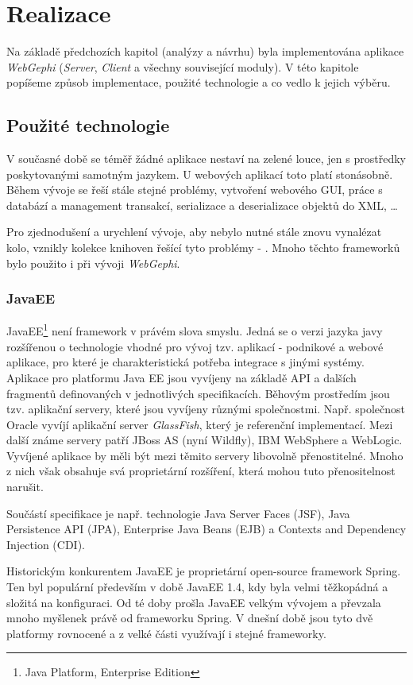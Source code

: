 \documentclass[thesis=M,czech]{FITthesis}[2014/05/6]
\begin{document}
\chapter{Realizace}
Na základě předchozích kapitol (analýzy a návrhu) byla implementována aplikace \textit{WebGephi} (\textit{Server}, \textit{Client} a všechny související moduly).
V této kapitole popíšeme způsob implementace, použité technologie a co vedlo k jejich výběru.

\section{Použité technologie}
V současné době se téměř žádné aplikace nestaví na zelené louce, jen s prostředky poskytovanými samotným jazykem. U webových aplikací 
toto platí stonásobně. Během vývoje se řeší stále stejné problémy, vytvoření webového GUI, práce s databází a management transakcí, serializace a deserializace 
objektů do XML, \ldots

Pro zjednodušení a urychlení vývoje, aby nebylo nutné stále znovu vynalézat kolo, vznikly kolekce knihoven řešící tyto problémy - . Mnoho 
těchto frameworků bylo použito i při vývoji \textit{WebGephi}. 

\subsection{JavaEE\cite{javaEE}}
JavaEE\footnote{Java Platform, Enterprise Edition} není framework v právém slova smyslu. Jedná se o verzi jazyka javy 
rozšířenou o technologie vhodné pro vývoj tzv.  aplikací - podnikové a webové aplikace, pro které je charakteristická potřeba 
integrace s jinými systémy. Aplikace pro platformu Java EE jsou vyvíjeny na základě API a dalších fragmentů definovaných v jednotlivých specifikacích.
Běhovým prostředím jsou tzv. aplikační servery, které jsou vyvíjeny různými společnostmi. Např. společnost Oracle vyvíjí aplikační server \textit{GlassFish}, který je
referenční implementací. Mezi další známe servery patří JBoss AS (nyní Wildfly), IBM WebSphere a WebLogic.
Vyvíjené aplikace by měli být mezi těmito servery libovolně přenostitelné. Mnoho z nich však obsahuje svá proprietární rozšíření, která mohou tuto přenositelnost narušit.

Součástí specifikace je např. technologie Java Server Faces (JSF), Java Persistence API (JPA), Enterprise Java Beans (EJB) a Contexts and Dependency Injection (CDI). 

Historickým konkurentem
JavaEE je proprietární open-source framework Spring\cite{spring}. Ten byl populární především v době JavaEE 1.4, kdy byla velmi těžkopádná a složitá na konfiguraci. Od té doby prošla JavaEE
velkým vývojem a převzala mnoho myšlenek právě od frameworku Spring. V dnešní době jsou tyto dvě platformy rovnocené a z velké části využívají i stejné frameworky.
\end{document}
